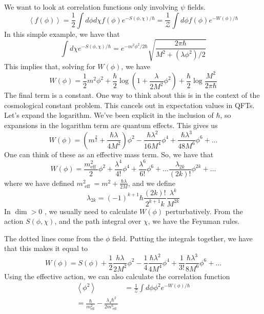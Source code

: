 \documentclass[11pt, oneside]{article}   	%
\theoremstyle{slanted}
\begin{document}
We want to look at correlation 
functions only involving $ \psi $ fields. 
\[
\left< f ( \phi )  \right>  = \frac{1}{2
} \int d \phi d \chi f \left( \phi  \right)  e ^{  - S \left( 
\phi , \chi  \right)  / \hbar  }  = \frac{1}{\mathcal{ Z } } 
\int d \phi f \left( \phi  \right)  e ^{  - W \left( \phi  \right)  / \hbar }
\]  In this simple example, we 
have that 
\[
\int d \chi e ^{  - S \left( \phi , \chi  \right)  / \hbar } 
= e ^{  - m ^ 2 \phi ^ 2  / 2 \hbar } \sqrt{ \frac{2 \pi \hbar }{ 
M ^ 2 + \left( \lambda \phi ^ 2  \right)   / 2 }} 
\]  This implies that, 
solving for $ W \left( \phi  \right)  $, 
we have 
\[
W \left( \phi  \right)   = \frac{1}{2 } m ^ 2 \phi ^ 2  + 
\frac{\hbar}{2 } \log \left( 1 + \frac{ \lambda }{ 2 M^ 2 } \phi ^ 2   \right)  
+ \frac{\hbar}{2 } \log \frac{ M ^ 2 }{ 2 \pi \hbar } 
\] The final term is a constant. 
One way to think about this 
is in the context of the cosmological 
constant problem. 
This cancels out in expectation 
values in QFTs. 
Let's expand the logarithm. 
We've been explicit in the inclusion of 
$ \hbar $, so expansions in the logarithm 
term are quantum effects. 
This gives us 
\[
W \left( \phi  \right)   = 
\left( m ^ \frac{2}{ 2 } + \frac{\hbar \lambda }{ 4 M ^ 2 }  \right)  \phi ^ 2 
- \frac{\hbar \lambda ^ 2 }{ 16 M ^ 4 } \phi ^ 4 + 
\frac{ \hbar \lambda ^ 3 }{ 48 M ^ 6} \phi ^ 6 + \dots 
\]One 
can think of these as an effective 
mass term. So, we have that 
\[
W\left( \phi  \right)   = 
\frac{ m _{ \text{eff } } ^ 2 }{ 2 } \phi ^ 2 + \frac{ \lambda ^ 4 }{ 4 ! } 
\phi ^ 4 + \frac{ \lambda ^ 6  }{6  ! } \phi ^ 6 + \dots \frac{ \lambda _{ 2k } }{ \left( 2k  \right)  ! } \phi ^{ 2k } + \dots 
\] where we have defined $ m_{ \text{ eff } } ^ 2  = m ^   2 + 
\frac{\hbar \lambda }{ 2 M } $, 
and we define 
\[
\lambda _{ 2k }  = \left( - 1  \right) ^{ k + 1 } \hbar 
\frac{ \left(  2k  \right)  ! }{ 2 ^{ k + 1 } k } \frac{\lambda ^ k }{ M ^{ 2 k }}
\] In $ \dim > 0  $ , we 
usually need to calculate 
$ W \left( \phi  \right)  $ perturbatively. 
From the action $ S( \phi , \chi ) $, 
and the path integral over $ \chi $, 
we have the Feynman rules. 

The dotted lines come from the $ \phi $ field. 
Putting the integrals 
together, we have that 
this makes it equal to 
\[
W \left( \phi  \right)   = S \left( \phi  \right)  
+ \frac{1}{2 } \frac{ h \lambda }{ 2 M ^ 2 }\phi ^ 2  - 
\frac{1}{4 } \frac{ \hbar \lambda ^ 2 }{ 4 M ^ 4 } \phi ^ 4 
+  \frac{1}{3 ! } \frac{ \hbar \lambda ^ 3 }{ 8 M ^ 6 } \phi ^ 6 + \dots 
\]  
Using the effective action, 
we can also calculate the correlation 
function 
\begin{align*}
\left< \phi ^ 2  \right> &=  \frac{1}{ \mathcal{ Z } } 
\int d \phi \phi ^ 2 e ^{  - W \left( \phi  \right)   / \hbar  }\\
= \frac{ \hbar  }{ m _{ \text{eff} }^ 2  } - \frac{ \lambda _ 4 \hbar ^ 2 }{2 
m _{ \text{ eff } } ^ 6 }
\end{align*}
\end{document}
